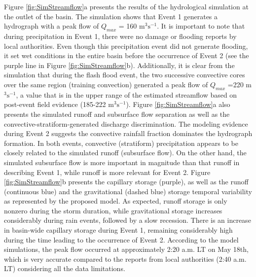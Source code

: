 \documentclass[hess, manuscript]{copernicus}
\begin{document}
Figure \ref{fig:SimStreamflow}a presents the results of the hydrological simulation at the outlet of the basin.  The simulation shows that Event 1 generates a hydrograph with a peak flow of $Q_{max}$ = 160 m$^3 \text{s}^{-1}$. It is important to note that during precipitation in Event 1, there were no damage or flooding reports by local authorities. Even though this precipitation event did not generate flooding, it set wet conditions in the entire basin before the occurrence of Event 2 (see the purple line in Figure \ref{fig:SimStreamflow}b). Additionally, it is clear from the simulation that during the flash flood event, the two successive convective cores over the same region (training convection) generated a peak flow of $Q_{max}$ =220 m$^3 \text{s}^{-1}$, a value that is in the upper range of the estimated streamflow based on post-event field evidence (185-222 m$^3 \text{s}^{-1}$). Figure \ref{fig:SimStreamflow}a also presents the simulated runoff and subsurface flow separation as well as the convective-stratiform-generated discharge discrimination. The modeling evidence during Event 2 suggests the convective rainfall fraction dominates the hydrograph formation. In both events, convective (stratiform) precipitation appears to be closely related to the simulated runoff (subsurface flow). On the other hand, the simulated subsurface flow is more important in magnitude than that runoff in describing Event 1, while runoff is more relevant for Event 2. Figure \ref{fig:SimStreamflow}b presents the capillary storage (purple), as well as the runoff (continuous blue) and the gravitational (dashed blue) storage temporal variability as represented by the proposed model. As expected, runoff storage is only nonzero during the storm duration, while gravitational storage increases considerably during rain events, followed by a slow recession. There is an increase in basin-wide capillary storage during Event 1, remaining considerably high during the time leading to the occurrence of Event 2. According to the model simulations, the peak flow occurred at approximately 2:20 a.m. LT on May 18th, which is very accurate compared to the reports from local authorities (2:40 a.m. LT) considering all the data limitations.\\
\end{document}

